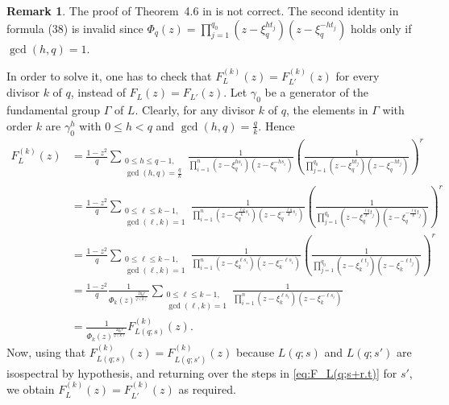 \documentclass[12pt,a4paper,final]{amsart}
\theoremstyle{plain}
\theoremstyle{definition}
\newtheorem{remark}[theorem]{Remark}
\theoremstyle{remark}
\numberwithin{equation}{section}
\begin{document}
\begin{remark}
The proof of Theorem~4.6 in \cite{LauretLinowitz} is not correct. 
The second identity in formula (38) is invalid since $\Phi_q(z)=\prod_{j=1}^{q_0} (z-\xi_q^{ht_j}) (z-\xi_q^{-ht_j})$ holds only if $\gcd(h,q)=1$. 

In order to solve it, one has to check that $F_L^{(k)}(z)=F_{L'}^{(k)}(z)$ for every divisor $k$ of $q$, instead of $F_L(z)=F_{L'}(z)$. 
Let $\gamma_0$ be a generator of the fundamental group $\Gamma$ of $L$. 
Clearly, for any divisor $k$ of $q$, the elements in $\Gamma$ with order $k$ are $\gamma_0^{h}$ with $0\leq h<q$ and $\gcd(h,q)=\frac{q}{k}$. 
Hence
\begin{equation}\label{eq:F_L(q;s+r.t)}
\begin{aligned}
F_{L}^{(k)}(z)&
= \frac{1-z^2}{q} \sum_{\substack{ 0\leq h\leq q-1,\\  \gcd(h,q)=\frac{q}{k}} } \frac{1}{ \prod_{i=1}^n (z-\xi_q^{hs_i})(z-\xi_q^{-hs_i})} \left(\frac{1}{\prod_{j=1}^{q_0} (z-\xi_q^{ht_j}) (z-\xi_q^{-ht_j})}\right)^r 
%
%
\\ &
= \frac{1-z^2}{q} \sum_{\substack{ 0\leq \ell\leq k-1,\\  \gcd(\ell,k)=1} } 
	\frac{1}{ \prod_{i=1}^n (z-\xi_q^{\frac{\ell q}{k} s_i})(z-\xi_q^{-\frac{\ell q}{k}s_i})} \left(\frac{1}{\prod_{j=1}^{q_0} (z-\xi_q^{\frac{\ell q}{k}t_j}) (z-\xi_q^{-\frac{\ell q}{k}t_j})}\right)^r 
%
%
\\ &
= \frac{1-z^2}{q} \sum_{\substack{ 0\leq \ell\leq k-1,\\  \gcd(\ell,k)=1} } 
	\frac{1}{ \prod_{i=1}^n (z-\xi_k^{\ell s_i}) (z-\xi_k^{-\ell s_i})} \left(\frac{1}{\prod_{j=1}^{q_0} (z-\xi_k^{\ell t_j}) (z-\xi_k^{-\ell t_j})}\right)^r 
%
%
\\ &
= \frac{1-z^2}{q} \frac{1}{\Phi_k(z)^{\frac{2q_0r}{\varphi(k)}}}
\sum_{\substack{ 0\leq \ell\leq k-1,\\  \gcd(\ell,k)=1} } 
	\frac{1}{ \prod_{i=1}^n (z-\xi_k^{\ell s_i}) (z-\xi_k^{-\ell s_i})}
%
%
%
\\ &
=  \frac{1}{\Phi_k(z)^{\frac{2q_0r}{\varphi(k)}}}
F_{L(q;s)}^{(k)}(z)
.
\end{aligned}
\end{equation}
Now, using that $F_{L(q;s)}^{(k)}(z)= F_{L(q;s')}^{(k)}(z)$ because $L(q;s)$ and $L(q;s')$ are isospectral by hypothesis, and returning over the steps in \eqref{eq:F_L(q;s+r.t)} for $s'$, we obtain $F_L^{(k)}(z)=F_{L'}^{(k)}(z)$ as required.
\hfill\qedsymbol 
\end{remark}
\end{document}
